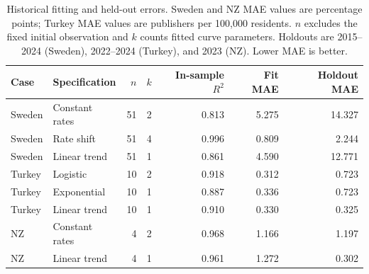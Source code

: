 \begin{table}[!htbp]\centering\small
\caption{Historical fitting and held-out errors. Sweden and NZ MAE values are percentage points; Turkey MAE values are publishers per 100,000 residents. $n$ excludes the fixed initial observation and $k$ counts fitted curve parameters. Holdouts are 2015--2024 (Sweden), 2022--2024 (Turkey), and 2023 (NZ). Lower MAE is better.}\label{tab:fitmetrics}
\begin{tabular}{llrrrrr}\toprule Case & Specification & $n$ & $k$ & In-sample $R^2$ & Fit MAE & Holdout MAE\\\midrule
Sweden & Constant rates & 51 & 2 & 0.813 & 5.275 & 14.327\\
Sweden & Rate shift & 51 & 4 & 0.996 & 0.809 & 2.244\\
Sweden & Linear trend & 51 & 1 & 0.861 & 4.590 & 12.771\\
Turkey & Logistic & 10 & 2 & 0.918 & 0.312 & 0.723\\
Turkey & Exponential & 10 & 1 & 0.887 & 0.336 & 0.723\\
Turkey & Linear trend & 10 & 1 & 0.910 & 0.330 & 0.325\\
NZ & Constant rates & 4 & 2 & 0.968 & 1.166 & 1.197\\
NZ & Linear trend & 4 & 1 & 0.961 & 1.272 & 0.302\\
\bottomrule\end{tabular}\end{table}
